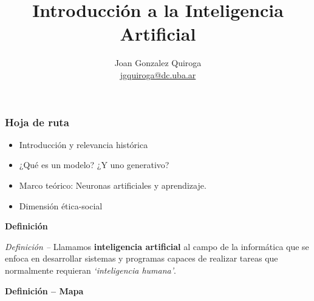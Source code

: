 \documentclass{beamer}
\title{Introducción a la Inteligencia Artificial}
\author[Joan Gonzalez Quiroga\hspace{2mm}|\hspace{2mm}jgquiroga@dc.uba.ar]
{%
  \texorpdfstring{\centering
      {\large Joan Gonzalez Quiroga}\\
      {\footnotesize\href{mailto:jgquiroga@dc.uba.ar}{jgquiroga@dc.uba.ar}}
  }
  {Joan Gonzalez Quiroga}
}
\date{}
\begin{document}
\frame{\titlepage}

\begin{frame}
\frametitle{\textbf{Hoja de ruta}}

\begin{itemize}
    \item<1-> Introducción y relevancia histórica
    \item<2-> ¿Qué es un modelo? ¿Y uno generativo?
    \item<3-> Marco teórico: Neuronas artificiales y aprendizaje.
    \item<4-> Dimensión ética-social
    
\end{itemize}

\end{frame}


\begin{frame}{\bfseries Definición}
\begin{center}
  \begin{tcolorbox}[width=0.8\textwidth]
    \raggedright
    {\itshape Definición -- }Llamamos \textbf{inteligencia artificial} al campo de la informática que se enfoca en desarrollar sistemas y programas capaces de realizar tareas que normalmente requieran \textit{`inteligencia humana'}.
  \end{tcolorbox}
\end{center}
\end{frame}

\begin{frame}{\bfseries Definición -- Mapa}
    \centering
\end{frame}
\end{document}
